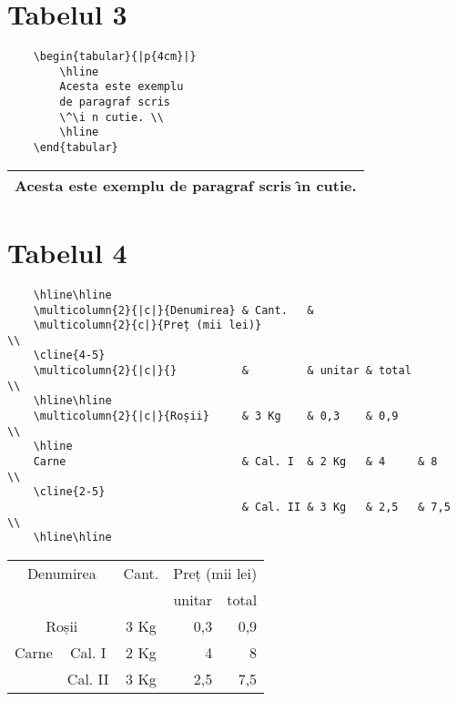 \documentclass[9pt,a4paper]{article}
\begin{document}
\pagebreak

\section*{Tabelul 3}

\begin{verbatim}
    \begin{tabular}{|p{4cm}|}
        \hline
        Acesta este exemplu
        de paragraf scris
        \^\i n cutie. \\
        \hline
    \end{tabular}
\end{verbatim}

\begin{tabular}{|p{4cm}|}
    \hline
    Acesta este exemplu
    de paragraf scris
    \^\i n cutie. \\
    \hline
\end{tabular}

\section*{Tabelul 4}

\begin{verbatim}
    \hline\hline
    \multicolumn{2}{|c|}{Denumirea} & Cant.   &
    \multicolumn{2}{c|}{Preț (mii lei)}                              \\
    \cline{4-5}
    \multicolumn{2}{|c|}{}          &         & unitar & total       \\
    \hline\hline
    \multicolumn{2}{|c|}{Roșii}     & 3 Kg    & 0,3    & 0,9         \\
    \hline
    Carne                           & Cal. I  & 2 Kg   & 4     & 8   \\
    \cline{2-5}
                                    & Cal. II & 3 Kg   & 2,5   & 7,5 \\
    \hline\hline
\end{verbatim}

\begin{tabular}{|c|c|c|r|r|}
    \hline\hline
    \multicolumn{2}{|c|}{Denumirea} & Cant.   &
    \multicolumn{2}{c|}{Preț (mii lei)}                              \\
    \cline{4-5}
    \multicolumn{2}{|c|}{}          &         & unitar & total       \\
    \hline\hline
    \multicolumn{2}{|c|}{Roșii}     & 3 Kg    & 0,3    & 0,9         \\
    \hline
    Carne                           & Cal. I  & 2 Kg   & 4     & 8   \\
    \cline{2-5}
                                    & Cal. II & 3 Kg   & 2,5   & 7,5 \\
    \hline\hline
\end{tabular}
\end{document}
